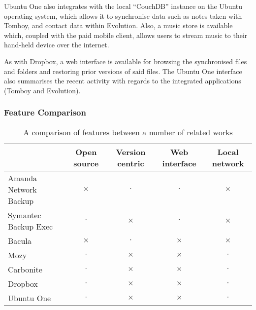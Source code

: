 \begin{bibunit}[plain]
Ubuntu One also integrates with the local ``CouchDB'' instance on the Ubuntu
operating system, which allows it to synchronise data such as notes taken with
Tomboy, and contact data within Evolution. Also, a music store is available
which, coupled with the paid mobile client, allows users to stream music to
their hand-held device over the internet.

As with Dropbox, a web interface is available for browsing the synchronised
files and folders and restoring prior versions of said files. The Ubuntu One
interface also summarises the recent activity with regards to the integrated
applications (Tomboy and Evolution).


\subsubsection{Feature Comparison}

\begin{table}[H]
    \centering
    \begin{tabular}{ | l | c | c | c | c | }
        \hline
        & Open source   & Version centric   & Web interface & Local network
            \\ \hline

        Amanda Network Backup   & $\times$  & $\cdot$   & $\cdot$   & $\times$
            \\ \hline

        Symantec Backup Exec    & $\cdot$   & $\times$  & $\cdot$   & $\times$
            \\ \hline

        Bacula                  & $\times$  & $\cdot$   & $\times$  & $\times$
            \\ \hline

        Mozy                    & $\cdot$   & $\times$  & $\times$  & $\cdot$
            \\ \hline

        Carbonite               & $\cdot$   & $\times$  & $\times$  & $\cdot$
            \\ \hline

        Dropbox                 & $\cdot$   & $\times$  & $\times$  & $\cdot$
            \\ \hline

        Ubuntu One              & $\cdot$   & $\times$  & $\times$  & $\cdot$
            \\ \hline
    \end{tabular}
    \caption{A comparison of features between a number of related works}
    \label{tab:feature-comparison}
\end{table}

\putbib[research]

\end{bibunit}
